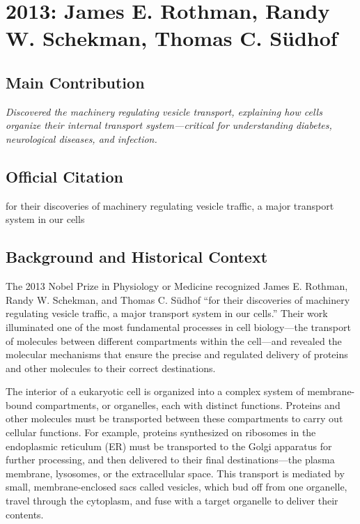 \chapter[2013 --- Rothman et al.]{2013: James E. Rothman, Randy W. Schekman, Thomas C. S\"udhof}
\label{ch:2013_Rothman}

\section*{Main Contribution}

\textit{Discovered the machinery regulating vesicle transport, explaining how cells organize their internal transport system---critical for understanding diabetes, neurological diseases, and infection.}\cite{nobel-2013,lecture-2013}

\section{Official Citation}

for their discoveries of machinery regulating vesicle traffic, a major transport system in our cells

\section{Background and Historical Context}

The 2013 Nobel Prize in Physiology or Medicine recognized James E. Rothman, Randy W. Schekman, and Thomas C. S\"udhof ``for their discoveries of machinery regulating vesicle traffic, a major transport system in our cells.'' Their work illuminated one of the most fundamental processes in cell biology---the transport of molecules between different compartments within the cell---and revealed the molecular mechanisms that ensure the precise and regulated delivery of proteins and other molecules to their correct destinations.

The interior of a eukaryotic cell is organized into a complex system of membrane-bound compartments, or organelles, each with distinct functions. Proteins and other molecules must be transported between these compartments to carry out cellular functions. For example, proteins synthesized on ribosomes in the endoplasmic reticulum (ER) must be transported to the Golgi apparatus for further processing, and then delivered to their final destinations---the plasma membrane, lysosomes, or the extracellular space. This transport is mediated by small, membrane-enclosed sacs called vesicles, which bud off from one organelle, travel through the cytoplasm, and fuse with a target organelle to deliver their contents.

